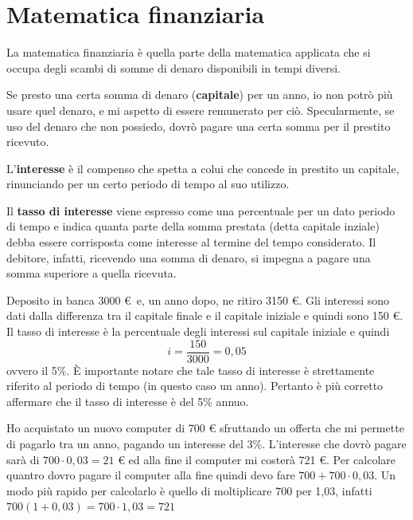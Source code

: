 
% 

\chapter{Matematica finanziaria}

La matematica finanziaria è quella parte della matematica applicata che si 
occupa degli scambi di somme di denaro disponibili in tempi diversi.

Se presto una certa somma di denaro (\textbf{capitale}) per un anno, io non 
potrò più usare quel denaro, e mi aspetto di essere remunerato per ciò. 
Specularmente, se uso del denaro che non possiedo, dovrò pagare una certa somma 
per il prestito ricevuto. 

L'\textbf{interesse} è il compenso che spetta a colui che concede in prestito un 
capitale, rinunciando per un certo periodo di tempo al suo utilizzo. 

Il \textbf{tasso di interesse} viene espresso come una percentuale per un dato 
periodo di tempo e indica quanta parte della somma prestata (detta capitale 
inziale) debba essere corrisposta come interesse al termine del tempo 
considerato. Il debitore, infatti, ricevendo una somma di denaro, si impegna a 
pagare una somma superiore a quella ricevuta. 

\begin{exrig} \begin{esempio} Deposito in banca 3000 € \,e, un anno dopo, ne 
ritiro 3150 €. Gli interessi sono dati dalla differenza tra il capitale finale e 
il capitale iniziale e quindi sono 150 €. Il tasso di interesse è la percentuale 
degli interessi sul capitale iniziale e quindi $$ i = \dfrac{150}{3000} = 0,05 
$$ ovvero il 5\%. \`{E} importante notare che tale tasso di interesse è 
strettamente riferito al periodo di tempo (in questo caso un anno). Pertanto è 
più corretto affermare che il tasso di interesse è del 5\% annuo. \end{esempio}

\begin{esempio} Ho acquistato un nuovo computer di 700 € sfruttando un offerta 
che mi permette di pagarlo tra un anno, pagando un interesse del 3\%. 
L'interesse che dovrò pagare sarà di $700 \cdot 0,03 = 21$ € ed alla fine il 
computer mi costerà 721 €. Per calcolare quantro dovro pagare il computer alla 
fine quindi devo fare $700+700\cdot0,03$. Un modo più rapido per calcolarlo è 
quello di moltiplicare 700 per 1,03, infatti $700(1+0,03)=700\cdot1,03=721$ 
\end{esempio}

\end{exrig}

